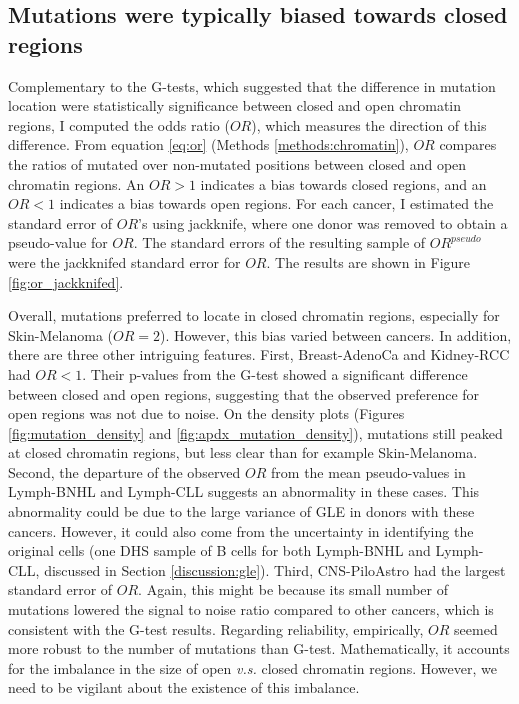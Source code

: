 

\subsection{Mutations were typically biased towards closed regions}\label{gle:or}
Complementary to the G-tests, which suggested that the difference in mutation location were statistically significance between closed and open chromatin regions, I computed the odds ratio ($OR$), which measures the direction of this difference. From equation \ref{eq:or} (Methods \ref{methods:chromatin}), $OR$ compares the ratios of mutated over non-mutated positions between closed and open chromatin regions. An $OR>1$ indicates a bias towards closed regions, and an $OR<1$ indicates a bias towards open regions. For each cancer, I estimated the standard error of $OR$'s using jackknife, where one donor was removed to obtain a pseudo-value for $OR$. The standard errors of the resulting sample of $OR^{pseudo}$ were the jackknifed standard error for $OR$. The results are shown in Figure \ref{fig:or_jackknifed}.



Overall, mutations preferred to locate in closed chromatin regions, especially for Skin-Melanoma ($OR=2$). However, this bias varied between cancers. In addition, there are three other intriguing features. First, Breast-AdenoCa and Kidney-RCC had $OR<1$. Their p-values from the G-test showed a significant difference between closed and open regions, suggesting that the observed preference for open regions was not due to noise. On the density plots (Figures \ref{fig:mutation_density} and \ref{fig:apdx_mutation_density}), mutations still peaked at closed chromatin regions, but less clear than for example Skin-Melanoma. Second, the departure of the observed $OR$ from the mean pseudo-values in Lymph-BNHL and Lymph-CLL suggests an abnormality in these cases. This abnormality could be due to the large variance of GLE in donors with these cancers. However, it could also come from the uncertainty in identifying the original cells (one DHS sample of B cells for both Lymph-BNHL and Lymph-CLL, discussed in Section \ref{discussion:gle}). Third, CNS-PiloAstro had the largest standard error of $OR$. Again, this might be because its small number of mutations lowered the signal to noise ratio compared to other cancers, which is consistent with the G-test results. Regarding reliability, empirically, $OR$ seemed more robust to the number of mutations than G-test. Mathematically, it accounts for the imbalance in the size of open \textit{v.s.} closed chromatin regions. However, we need to be vigilant about the existence of this imbalance.

